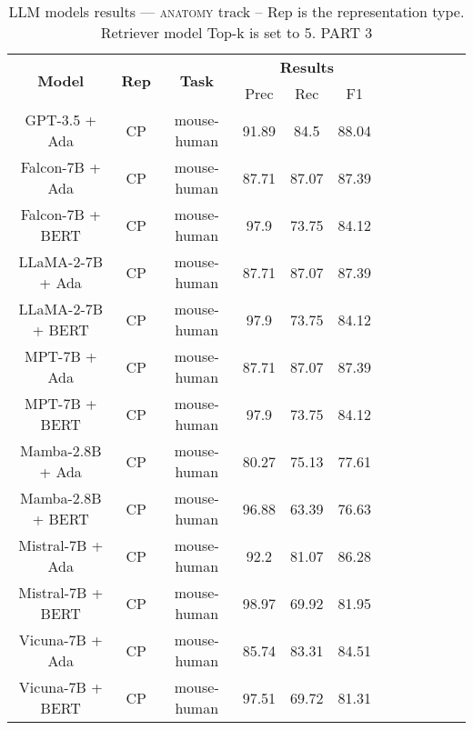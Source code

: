 \begin{table}
        \centering
        \small
        \caption{LLM models results --- \textsc{anatomy} track -- Rep is the representation type. Retriever model Top-k is set to 5. PART 3 } \label{tab:llm_anatomy3}
        \begin{tabular}{|c|c|c|c|c|c|c|c|c|c|c|c|}
            \hline
             \multirow{2}{*}{\textbf{Model}}  & \multirow{2}{*}{\textbf{Rep}}  & \multirow{2}{*}{\textbf{Task}} &  \multicolumn{3}{c|}{\textbf{Results}} \\
             \cline{4-6}
              & & & Prec & Rec & F1  \\
            \hline
	GPT-3.5 + Ada  & CP & mouse-human  &  91.89 &  84.5 & 88.04  \\
	Falcon-7B + Ada  & CP & mouse-human  &  87.71 &  87.07 & 87.39  \\
	Falcon-7B + BERT  & CP & mouse-human  &  97.9 &  73.75 & 84.12  \\
	LLaMA-2-7B + Ada  & CP & mouse-human  &  87.71 &  87.07 & 87.39  \\
	LLaMA-2-7B + BERT  & CP & mouse-human  &  97.9 &  73.75 & 84.12  \\
	MPT-7B + Ada  & CP & mouse-human  &  87.71 &  87.07 & 87.39  \\
	MPT-7B + BERT  & CP & mouse-human  &  97.9 &  73.75 & 84.12  \\
	Mamba-2.8B + Ada  & CP & mouse-human  &  80.27 &  75.13 & 77.61  \\
	Mamba-2.8B + BERT  & CP & mouse-human  &  96.88 &  63.39 & 76.63  \\
	Mistral-7B + Ada  & CP & mouse-human  &  92.2 &  81.07 & 86.28  \\
	Mistral-7B + BERT  & CP & mouse-human  &  98.97 &  69.92 & 81.95  \\
	Vicuna-7B + Ada  & CP & mouse-human  &  85.74 &  83.31 & 84.51  \\
	Vicuna-7B + BERT  & CP & mouse-human  &  97.51 &  69.72 & 81.31  \\
	\hline
\end{tabular}
    \end{table}
